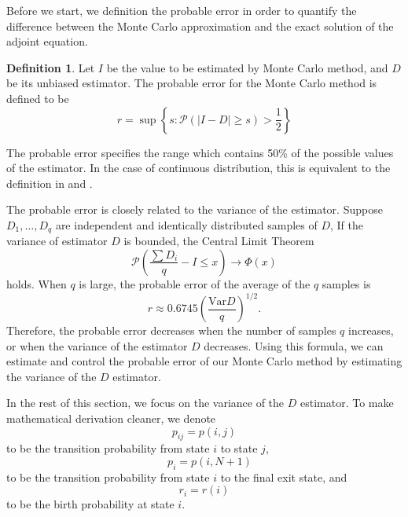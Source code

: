 \documentclass[a4paper,11pt]{article}
\theoremstyle{remark}
\theoremstyle{definition}
\newtheorem{definition}[theorem]{Definition}
\begin{document}
    Before we start, we definition the probable error in order to quantify
    the difference between the Monte Carlo approximation and the exact solution
    of the adjoint equation.
    \begin{definition}
        Let $I$ be the value to be estimated by Monte Carlo method,
        and $D$ be its unbiased estimator. The probable error for the Monte
        Carlo method is defined to be
        \begin{equation}
            r = \sup \left\{ s : \mathcal{P}\left( |I-D| \ge s \right)
                             > \frac12 \right\}
        \end{equation}
    \end{definition}
    The probable error specifies the range which contains 50\% of the possible
    values of the estimator. In the case of continuous distribution, this
    is equivalent to the definition in \cite{Tan2001} and \cite{Sobol1973}.

    The probable error is closely related to the variance of the estimator.
    Suppose $D_1, \ldots, D_q$ are independent and identically distributed
    samples of $D$, If the variance of estimator $D$ is bounded, the Central
    Limit Theorem
    \[ \mathcal{P} \left( \frac{\sum D_i}q - I \le x \right) \to \Phi(x)
    \]
    holds. When $q$ is large, the probable error of the average of the $q$
    samples is \cite{Tan2001,Tan2002}
    \begin{equation} \label{proberr}
        r \approx 0.6745 \left( \frac{\text{Var} D }{q} \right)^{1/2} .
    \end{equation}
    Therefore, the probable error decreases when the number of samples $q$
    increases, or when the variance of the estimator $D$ decreases.  Using
    this formula, we can estimate and control the probable error of our
    Monte Carlo method by estimating the variance of the $D$ estimator.
    
    In the rest of this section, we focus on the variance of the $D$ estimator.
    To make mathematical derivation cleaner, we denote \[ p_{ij} = p(i,j)\]
    to be the transition probability from state $i$ to state $j$,
    \[\quad p_i = p(i,N+1)
    \]
    to be the transition probability from state $i$ to the final exit state,
    and \[r_i = r(i)\] to be the birth probability at state $i$.
    
\end{document}
